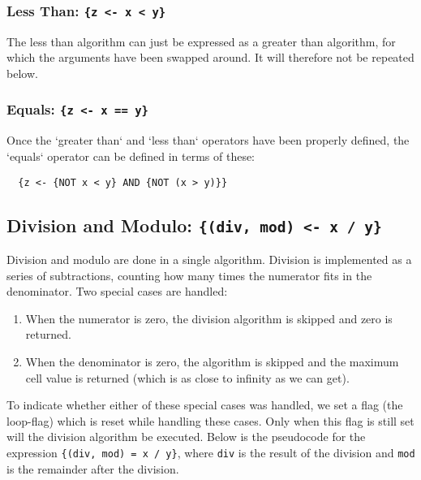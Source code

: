 \subsubsection{Less Than: \texttt{\{z <- x < y\}}}
The less than algorithm can just be expressed as a greater than algorithm, for which the arguments have been swapped around. It will therefore not be repeated below.

\subsubsection{Equals: \texttt{\{z <- x == y\}}}
Once the `greater than` and `less than` operators have been properly defined, the `equals` operator can be defined in terms of these:
\begin{lstlisting}
  {z <- {NOT x < y} AND {NOT (x > y)}}
\end{lstlisting}

\subsection{Division and Modulo: \texttt{\{(div, mod) <- x / y\}}}
Division and modulo are done in a single algorithm. Division is implemented as a series of subtractions, counting how many times the numerator fits in the denominator. Two special cases are handled:
\begin{enumerate}
\item When the numerator is zero, the division algorithm is skipped and zero is returned.
\item When the denominator is zero, the algorithm is skipped and the maximum cell value is returned (which is as close to infinity as we can get).
\end{enumerate}
To indicate whether either of these special cases was handled, we set a flag (the loop-flag) which is reset while handling these cases. Only when this flag is still set will the division algorithm be executed. Below is the pseudocode for the expression \texttt{\{(div, mod) = x / y\}}, where \texttt{div} is the result of the division and \texttt{mod} is the remainder after the division.

